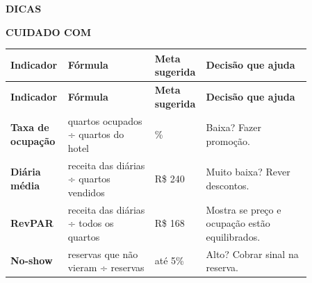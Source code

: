 \documentclass[11pt,a4paper]{article}
\newcommand{\subsecao}[1]{\Needspace{8\baselineskip}\vspace{8pt}{\large\bfseries\color{cor}#1}\par}
\begin{document}
\begin{tcbraster}[raster columns=2,raster equal height=rows,raster column skip=6pt,raster row skip=6pt,raster before skip=4pt,raster after skip=8pt]
\begin{tcolorbox}[enhanced,colback=white,colframe=cor!25,boxrule=0.8pt,arc=6pt,left=8pt,right=8pt,top=6pt,bottom=6pt,colback=suave!50]
{\footnotesize\bfseries\color{cor}\MakeUppercase{Dicas}}\par{}
\end{tcolorbox}
\begin{tcolorbox}[enhanced,colback=white,colframe=cor!25,boxrule=0.8pt,arc=6pt,left=8pt,right=8pt,top=6pt,bottom=6pt,colback=suave!50]
{\footnotesize\bfseries\color{cor}\MakeUppercase{Cuidado com}}\par{}
\end{tcolorbox}
\end{tcbraster}
\subsecao{\faBoxOpen\ Os 4 indicadores explicados}
\begingroup\small
\begin{longtable}{>{\raggedright\arraybackslash}p{0.121\linewidth}>{\raggedright\arraybackslash}p{0.288\linewidth}>{\raggedright\arraybackslash}p{0.098\linewidth}>{\raggedright\arraybackslash}p{0.348\linewidth}}
\rowcolor{cor} \color{white}\textbf{\footnotesize Indicador} & \color{white}\textbf{\footnotesize Fórmula} & \color{white}\textbf{\footnotesize Meta sugerida} & \color{white}\textbf{\footnotesize Decisão que ajuda} \\
\endfirsthead
\rowcolor{cor} \color{white}\textbf{\footnotesize Indicador} & \color{white}\textbf{\footnotesize Fórmula} & \color{white}\textbf{\footnotesize Meta sugerida} & \color{white}\textbf{\footnotesize Decisão que ajuda} \\
\endhead
\rowcolor{white}\textbf{Taxa de ocupação} & quartos ocupados ÷ quartos do hotel & 70\% & Baixa? Fazer promoção. \\ \hline
\rowcolor{suave!55}\textbf{Diária média} & receita das diárias ÷ quartos vendidos & R\$ 240 & Muito baixa? Rever descontos. \\ \hline
\rowcolor{white}\textbf{RevPAR} & receita das diárias ÷ todos os quartos & R\$ 168 & Mostra se preço e ocupação estão equilibrados. \\ \hline
\rowcolor{suave!55}\textbf{No-show} & reservas que não vieram ÷ reservas & até 5\% & Alto? Cobrar sinal na reserva. \\ \hline
\end{longtable}
\end{document}
